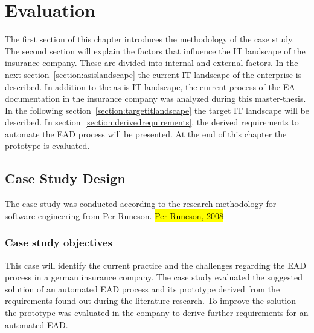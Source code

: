 \chapter{Evaluation}\label{chapter:evaluation}


The first section of this chapter introduces the methodology of the case study. 
The second section will explain the factors that influence the IT landscape of the insurance company. These are divided into internal and external factors. In the next section~\ref{section:asislandscape} the current IT landscape of the enterprise is described. In addition to the as-is IT landscape, the current process of the EA documentation in the insurance company was analyzed during this master-thesis. 
In the following section~\ref{section:targetitlandscape} the target IT landscape will be described.
In section~\ref{section:derivedrequirements}, the derived requirements to automate the EAD process will be presented.
At the end of this chapter the prototype is evaluated.

\section{Case Study Design}\label{section:casestudy}

The case study was conducted according to the research methodology for software engineering from Per Runeson. \hl{Per Runeson, 2008}

\subsection{Case study objectives}\label{subsection:casestudyobjectives}

This case will identify the current practice and the challenges regarding the EAD process in a german insurance company. The case study evaluated the suggested solution of an automated EAD process and its prototype derived from the requirements found out during the literature research. To improve the solution the prototype was evaluated in the company to derive further requirements for an automated EAD.


